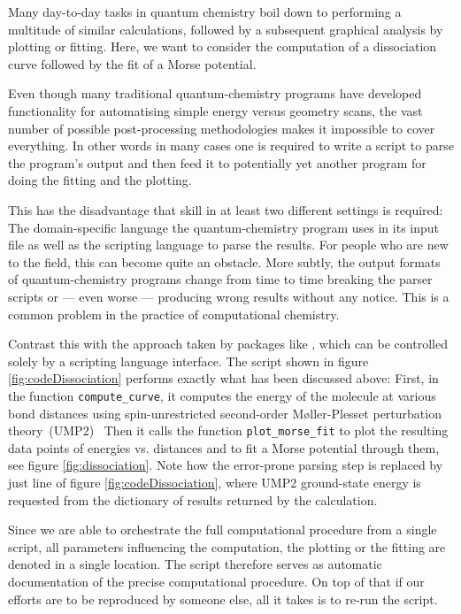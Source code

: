 Many day-to-day tasks in quantum chemistry boil down to
performing a multitude of similar calculations,
followed by a subsequent graphical analysis
by plotting or fitting.
Here, we want to consider the computation of a dissociation curve
followed by the fit of a Morse potential.

Even though many traditional quantum-chemistry programs
have developed functionality for automatising simple
energy versus geometry scans,
the vast number of possible post-processing methodologies
makes it impossible to cover everything.
In other words in many cases one is required to write a script
to parse the program's output and then feed it to potentially yet
another program for doing the fitting and the plotting.

This has the disadvantage
that skill in at least two different settings is required:
The domain-specific language the quantum-chemistry program uses
in its input file as well as the scripting language to parse the results.
For people who are new to the field, this can become quite an obstacle.
More subtly, the output formats
of quantum-chemistry programs change from time to time
breaking the parser scripts or --- even worse ---
producing wrong results without any notice.
This is a common problem in the practice of computational chemistry.

Contrast this with the approach taken by packages like \molsturm,
which can be controlled solely by a scripting language interface.
The \python script shown in figure \ref{fig:codeDissociation} performs
exactly what has been discussed above:
First, in the function \texttt{compute\_curve},
it computes the energy of the  molecule
at various bond distances using spin-unrestricted
second-order Møller-Plesset perturbation theory~(UMP2)~\cite{Handy1985,Knowles1985}
Then it calls the function \texttt{plot\_morse\_fit}
to plot the resulting data points of energies vs. distances
and to fit a Morse potential through them,
see figure \ref{fig:dissociation}.
Note how the error-prone parsing step is replaced by just
line \lextract of figure \ref{fig:codeDissociation},
where UMP2 ground-state energy is requested from the
dictionary of results returned by the calculation.

Since we are able to orchestrate the full computational procedure
from a single script,
all parameters influencing the computation, the plotting or the fitting
are denoted in a single location.
The script therefore serves as automatic documentation
of the precise computational procedure.
On top of that if our efforts are to be reproduced by someone else,
all it takes is to re-run the script.

